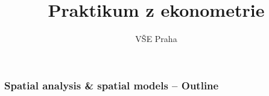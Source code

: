 \documentclass{beamer}
\title[Block 3]{Praktikum z ekonometrie} %
\author{VŠE Praha} %
\institute[4EK417] %
{
\medskip
\textit{Tomáš Formánek} %
}
\date{} %
\begin{document}
\begin{frame}
\titlepage %
\end{frame}
\begin{frame}
\frametitle{Spatial analysis \& spatial models -- Outline} %
\tableofcontents %
\end{frame}
\end{document}

